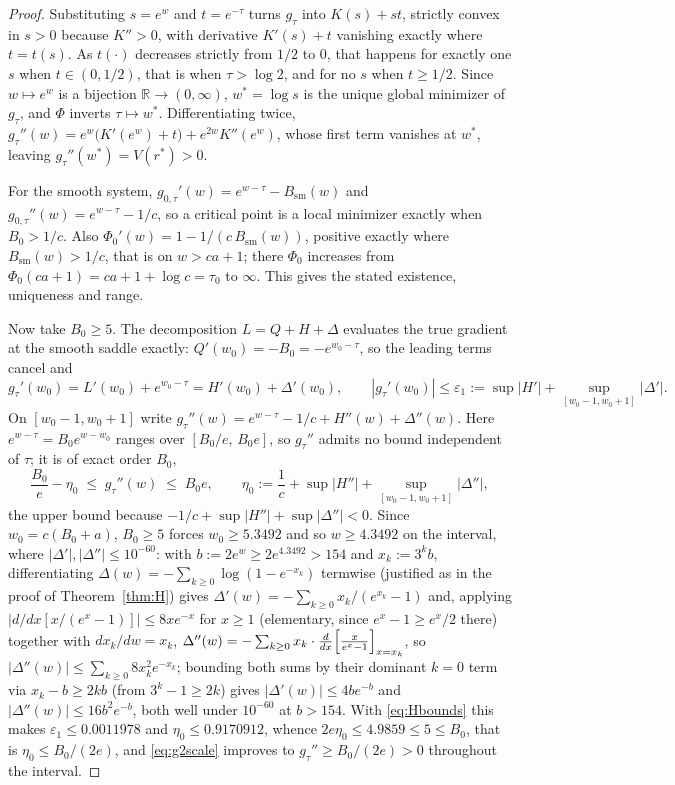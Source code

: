 \documentclass[11pt]{amsart}
\theoremstyle{plain}
\theoremstyle{definition}
\theoremstyle{remark}
\newcommand{\R}{\mathbb{R}}
\begin{document}
\begin{proof}
Substituting $s=e^w$ and $t=e^{-\tau}$ turns $g_\tau$ into $K(s)+st$, strictly convex in $s>0$
because $K''>0$, with derivative $K'(s)+t$ vanishing exactly where $t = t(s)$. As $t(\cdot)$
decreases strictly from $1/2$ to $0$, that happens for exactly one $s$ when $t\in(0,1/2)$, that
is when $\tau>\log2$, and for no $s$ when $t\ge1/2$. Since $w\mapsto e^w$ is a bijection
$\R\to(0,\infty)$, $w^* = \log s$ is the unique global minimizer of $g_\tau$, and $\Phi$ inverts
$\tau\mapsto w^*$. Differentiating twice, $g_\tau''(w) = e^w\bigl(K'(e^w)+t\bigr)+e^{2w}K''(e^w)$,
whose first term vanishes at $w^*$, leaving $g_\tau''(w^*) = V(r^*)>0$.

For the smooth system, $g_{0,\tau}'(w) = e^{w-\tau}-B_{\mathrm{sm}}(w)$ and $g_{0,\tau}''(w) =
e^{w-\tau}-1/c$, so a critical point is a local minimizer exactly when $B_0 > 1/c$. Also
$\Phi_0'(w) = 1-1/(c\,B_{\mathrm{sm}}(w))$, positive exactly where $B_{\mathrm{sm}}(w)>1/c$, that
is on $w>ca+1$; there $\Phi_0$ increases from $\Phi_0(ca+1) = ca+1+\log c = \tau_0$ to $\infty$.
This gives the stated existence, uniqueness and range.

Now take $B_0\ge5$. The decomposition $L = Q+H+\Delta$ evaluates the true gradient at the smooth
saddle exactly: $Q'(w_0) = -B_0 = -e^{w_0-\tau}$, so the leading terms cancel and
\begin{equation}
\label{eq:gradatw0}
g_\tau'(w_0) = L'(w_0)+e^{w_0-\tau} = H'(w_0)+\Delta'(w_0), \qquad
|g_\tau'(w_0)| \le \varepsilon_1 := \sup|H'|+\sup_{[w_0-1,w_0+1]}|\Delta'| .
\end{equation}
On $[w_0-1,w_0+1]$ write $g_\tau''(w) = e^{w-\tau}-1/c+H''(w)+\Delta''(w)$. Here $e^{w-\tau} =
B_0e^{w-w_0}$ ranges over $[B_0/e,\,B_0e]$, so $g_\tau''$ admits no bound independent of $\tau$;
it is of exact order $B_0$,
\begin{equation}
\label{eq:g2scale}
\frac{B_0}{e}-\eta_0 \;\le\; g_\tau''(w) \;\le\; B_0e, \qquad
\eta_0 := \frac1c+\sup|H''|+\sup_{[w_0-1,w_0+1]}|\Delta''|,
\end{equation}
the upper bound because $-1/c+\sup|H''|+\sup|\Delta''|<0$. Since $w_0 = c(B_0+a)$, $B_0\ge5$ forces
$w_0\ge5.3492$ and so $w\ge4.3492$ on the interval, where $|\Delta'|,|\Delta''|\le10^{-60}$: with
$b:=2e^w\ge2e^{4.3492}>154$ and $x_k:=3^kb$, differentiating $\Delta(w)=-\sum_{k\ge0}\log(1-e^{-x_k})$
termwise (justified as in the proof of Theorem~\ref{thm:H}) gives $\Delta'(w) =
-\sum_{k\ge0}x_k/(e^{x_k}-1)$ and, applying $|d/dx[x/(e^x-1)]|\le8xe^{-x}$ for $x\ge1$ (elementary,
since $e^x-1\ge e^x/2$ there) together with $dx_k/dw=x_k$, $\Delta''(w) = -\sum_{k\ge0}x_k\cdot
\frac{d}{dx}\Bigl[\frac{x}{e^x-1}\Bigr]_{x=x_k}$, so $|\Delta''(w)|\le\sum_{k\ge0}8x_k^2e^{-x_k}$;
bounding both sums by their dominant $k=0$ term via $x_k-b\ge2kb$ (from $3^k-1\ge2k$) gives
$|\Delta'(w)|\le4be^{-b}$ and $|\Delta''(w)|\le16b^2e^{-b}$, both well under $10^{-60}$ at
$b>154$. With \eqref{eq:Hbounds} this makes
$\varepsilon_1 \le 0.0011978$ and $\eta_0 \le 0.9170912$, whence $2e\eta_0 \le 4.9859 \le 5 \le
B_0$, that is $\eta_0 \le B_0/(2e)$, and \eqref{eq:g2scale} improves to $g_\tau''\ge B_0/(2e)>0$
throughout the interval.


\end{proof}
\end{document}
